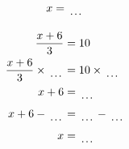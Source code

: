 \documentclass[12pt]{article}
\newcounter{minipagecount}
\begin{document}
\begin{multicols}{2}
\begin{minipage}[t]{0.45\textwidth}
\begin{align*}
        x &= \dotuline{\hspace{5mm}}\\
    \end{align*}
\end{minipage} %
\noindent{(\theminipagecount)}\hspace{0.1mm} %
\begin{minipage}[t]{0.45\textwidth} %
    \vspace{-26pt}  %
    \raggedright %
    \begin{align*} %
        \frac{x + 6}{3} &= 10\\
        \frac{x + 6}{3} \times\dotuline{\hspace{5mm}} &= 10 \times\dotuline{\hspace{5mm}}\\
        x + 6 &= \dotuline{\hspace{5mm}}\\
        x + 6 - \dotuline{\hspace{5mm}} &= \dotuline{\hspace{5mm}} - \dotuline{\hspace{5mm}}\\
        x &= \dotuline{\hspace{5mm}}\\
    \end{align*}
\end{minipage}\newpage
\noindent{(\theminipagecount)}\hspace{0.1mm} %
\begin{minipage}[t]{0.45\textwidth} %
    \vspace{-26pt}  %

\end{minipage}
\end{multicols}
\end{document}
